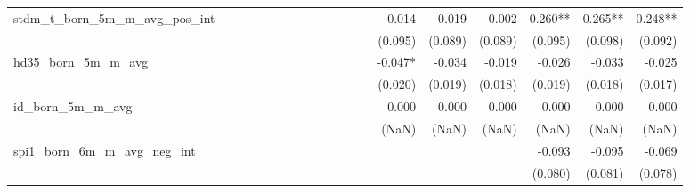 \begin{tabular}{lrrrrrrrrrrrrrrrrrr}
stdm\_t\_born\_5m\_m\_avg\_pos\_int         &             &             &             &             &             &             &             &             &             &             &             &             &      -0.014 &      -0.019 &      -0.002 &     0.260** &     0.265** &     0.248** \\ 
                                            &             &             &             &             &             &             &             &             &             &             &             &             &     (0.095) &     (0.089) &     (0.089) &     (0.095) &     (0.098) &     (0.092) \\ 
hd35\_born\_5m\_m\_avg                      &             &             &             &             &             &             &             &             &             &             &             &             &     -0.047* &      -0.034 &      -0.019 &      -0.026 &      -0.033 &      -0.025 \\ 
                                            &             &             &             &             &             &             &             &             &             &             &             &             &     (0.020) &     (0.019) &     (0.018) &     (0.019) &     (0.018) &     (0.017) \\ 
id\_born\_5m\_m\_avg                        &             &             &             &             &             &             &             &             &             &             &             &             &       0.000 &       0.000 &       0.000 &       0.000 &       0.000 &       0.000 \\ 
                                            &             &             &             &             &             &             &             &             &             &             &             &             &       (NaN) &       (NaN) &       (NaN) &       (NaN) &       (NaN) &       (NaN) \\ 
spi1\_born\_6m\_m\_avg\_neg\_int            &             &             &             &             &             &             &             &             &             &             &             &             &             &             &             &      -0.093 &      -0.095 &      -0.069 \\ 
                                            &             &             &             &             &             &             &             &             &             &             &             &             &             &             &             &     (0.080) &     (0.081) &     (0.078) \\ 

\end{tabular}

